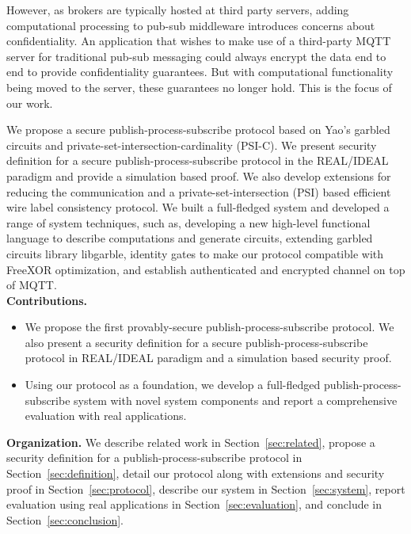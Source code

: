 However, as brokers are typically hosted at third party servers, adding
computational processing to pub-sub middleware  introduces concerns about
confidentiality. An application that wishes to make use of a third-party MQTT
server for traditional pub-sub messaging could always encrypt the data end to
end to provide confidentiality guarantees. But with computational functionality
being moved to the server, these guarantees no longer hold. This is the focus
of our work.

We propose a secure publish-process-subscribe protocol based on Yao's garbled
circuits and private-set-intersection-cardinality (PSI-C). We present security
definition for a secure publish-process-subscribe protocol in the REAL/IDEAL
paradigm and provide a simulation based proof. We also develop extensions for
reducing the communication and a private-set-intersection (PSI) based efficient
wire label consistency protocol. We built a full-fledged system and developed a
range of system techniques, such as, developing a new high-level functional
language to describe computations and generate circuits, extending garbled
circuits library libgarble, identity gates to make our protocol compatible with
FreeXOR optimization, and establish authenticated and encrypted channel on top
of MQTT.  \\[6pt]
\noindent\textbf{Contributions.}

\begin{itemize}[leftmargin=*,itemsep=4pt,topsep=4pt]

	\item We propose the first provably-secure publish-process-subscribe
		protocol. We also present a security definition for a secure
		publish-process-subscribe protocol in REAL/IDEAL paradigm and a
		simulation based security proof.

	\item Using our protocol as a foundation, we develop a full-fledged
		publish-process-subscribe system with novel system components and report a
		comprehensive evaluation with real applications.

\end{itemize}

\noindent\textbf{Organization.} We describe related work in
Section~\ref{sec:related}, propose a security definition for a
publish-process-subscribe protocol in Section~\ref{sec:definition}, detail our
protocol along with extensions and security proof in
Section~\ref{sec:protocol}, describe our system in Section~\ref{sec:system},
report evaluation using real applications in Section~\ref{sec:evaluation}, and
conclude in Section~\ref{sec:conclusion}.





